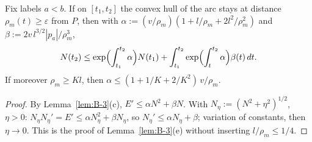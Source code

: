 \begin{lemma}\label{lem:Estar-duh}
Fix labels $a<b$. If on $[t_1,t_2]$ the convex hull of the arc stays at distance $\rho_m(t)\ge\varepsilon$ from $P$, then with
$\alpha:=(v/\rho_m)(1+l/\rho_m+2l^2/\rho_m^2)$ and $\beta:=2v\,l^{3/2}|p_a|/\rho_m^3$,
\[
N(t_2)\le\exp\Bigl(\int_{t_1}^{t_2}\alpha\Bigr)N(t_1)+\int_{t_1}^{t_2}\exp\Bigl(\int_t^{t_2}\alpha\Bigr)\beta(t)\,dt .
\]
If moreover $\rho_m\ge Kl$, then $\alpha\le(1+1/K+2/K^2)\,v/\rho_m$.
\end{lemma}
\begin{proof}
By Lemma~\ref{lem:B-3}(c), $E'\le\alpha N^2+\beta N$. With $N_\eta:=(N^2+\eta^2)^{1/2}$, $\eta>0$:
$N_\eta N_\eta'=E'\le\alpha N_\eta^2+\beta N_\eta$, so $N_\eta'\le\alpha N_\eta+\beta$; variation of constants, then $\eta\to0$.
This is the proof of Lemma~\ref{lem:B-3}(e) without inserting $l/\rho_m\le1/4$.
\end{proof}

